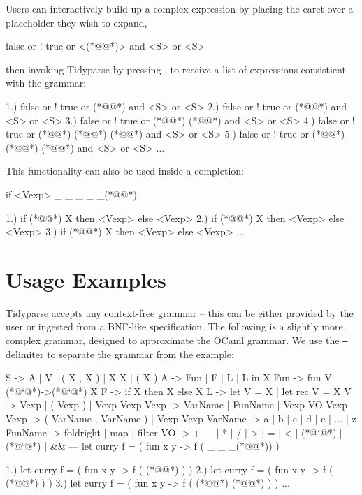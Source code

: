 \documentclass[sigplan,nonacm]{acmart}\settopmatter{printfolios=false,printccs=false,printacmref=false}
\begin{document}
Users can interactively build up a complex expression by placing the caret over a placeholder they wish to expand,

\begin{tidyinput}
false or ! true or <(*@@*)> and <S> or <S>
\end{tidyinput}

\noindent then invoking Tidyparse by pressing \keys{\ctrl + \SPACE}, to receive a list of expressions consistient with the grammar:

\begin{tidyoutput}
1.) false or ! true or (*@@*) and <S> or <S>
2.) false or ! true or (*@@*) and <S> or <S>
3.) false or ! true or (*@\hlorange{!}@*) (*@@*) and <S> or <S>
4.) false or ! true or (*@@*) (*@@*) (*@@*) and <S> or <S>
5.) false or ! true or (*@@*) (*@@*) (*@@*) and <S> or <S>
...
\end{tidyoutput}

\noindent This functionality can also be used inside a completion:

\begin{tidyinput}
if <Vexp> _ _ _ _ _(*@\caret{ }@*)
\end{tidyinput}

\begin{tidyoutput}
1.) if (*@@*) X then <Vexp> else <Vexp>
2.) if (*@@*) X then <Vexp> else <Vexp>
3.) if (*@@*) X then <Vexp> else <Vexp>
...
\end{tidyoutput}


\section{Usage Examples}

Tidyparse accepts any context-free grammar -- this can be either provided by the user or ingested from a BNF-like specification. The following is a slightly more complex grammar, designed to approximate the OCaml grammar. We use the {\color{blue}\texttt{---}} delimiter to separate the grammar from the example:

\begin{tidyinput}
S -> A | V | ( X , X ) | X X | ( X )
A -> Fun | F | L | L in X
Fun -> fun V (*@`@*)->(*@`@*) X
F -> if X then X else X
L -> let V = X | let rec V = X
V -> Vexp | ( Vexp ) | Vexp Vexp
Vexp -> VarName | FunName | Vexp VO Vexp
Vexp -> ( VarName , VarName ) | Vexp Vexp
VarName -> a | b | c | d | e | ... | z
FunName -> foldright | map | filter
VO ->  + | - | * | / | > | = | < | (*@`@*)||(*@`@*) | &&
---
let curry f = ( fun x y -> f ( _ _ _(*@\caret{ }@*)) )
\end{tidyinput}
\begin{tidyoutput}
1.) let curry f = ( fun x y -> f ( (*@@*) ) )
2.) let curry f = ( fun x y -> f ( (*@@*) ) )
3.) let curry f = ( fun x y -> f ( (*@@*) (*@@*) ) )
...
\end{tidyoutput}
\end{document}
